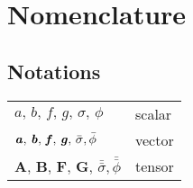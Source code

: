 \chapter{Nomenclature}

\section*{Notations}

\begin{center}

\begin{tabular}{p{}p{}}
	$a,\,b,\,f,\,g,\,\sigma,\,\phi$ & scalar \\
	$\textbf{\textit{a}},\,\textbf{\textit{b}},\,\textbf{\textit{f}},\,\textbf{\textit{g}},\,\bar{\sigma}, \bar{\phi}$ & vector \\	
	$\textbf{A},\,\textbf{B},\,\textbf{F},\,\textbf{G},\,\bar{\bar{\sigma}}, \bar{\bar{\phi}}$ & tensor \\
\end{tabular}
\end{center}
